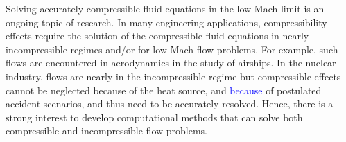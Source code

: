 \documentclass[preprint,10pt]{elsarticle}
\newcommand{\tcb}[1]{\textcolor{blue}{#1}}
\begin{document}

Solving accurately compressible fluid equations in the low-Mach limit is an ongoing topic of research. 
In many engineering applications, compressibility effects require the solution of the compressible fluid equations
in nearly incompressible regimes and/or for low-Mach flow problems. For example, such flows are encountered 
in aerodynamics in the study of airships. In the nuclear industry, flows are nearly in the incompressible regime but 
compressible effects cannot be neglected because of the heat source, and \tcb{because} of postulated accident scenarios, 
and thus need to be accurately resolved. Hence, there is a strong interest to develop computational methods 
that can solve both compressible and incompressible flow problems.  
\end{document}
